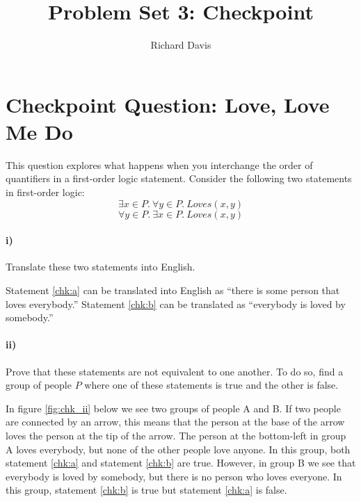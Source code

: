\documentclass[10pt,letter]{article}
\begin{document}

\title{Problem Set 3: Checkpoint}

\author{Richard Davis}

 
\maketitle 


\section*{Checkpoint Question: Love, Love Me Do}
This question explores what happens when you interchange the order of quantifiers in a first-order logic statement. Consider the following two statements in first-order logic:
\begin{equation} \label{chk:a}
\exists x \in P .\ \forall y \in P .\ Loves(x, y)
\end{equation}
\begin{equation} \label{chk:b}
\forall y \in P .\ \exists x \in P .\ Loves(x, y)
\end{equation}
\paragraph{i)} Translate these two statements into English.

Statement \ref{chk:a} can be translated into English as ``there is some person that loves everybody.'' Statement \ref{chk:b} can be translated as ``everybody is loved by somebody.''
\paragraph{ii)} Prove that these statements are not equivalent to one another. To do so, find a group of people $P$ where one of these statements is true and the other is false.

In figure \ref{fig:chk_ii} below we see two groups of people A and B. If two people are connected by an arrow, this means that the person at the base of the arrow loves the person at the tip of the arrow. The person at the bottom-left in group A loves everybody, but none of the other people love anyone. In this group, both statement \ref{chk:a} and statement \ref{chk:b} are true. However, in group B we see that everybody is loved by somebody, but there is no person who loves everyone. In this group, statement \ref{chk:b} is true but statement \ref{chk:a} is false.
\end{document}

